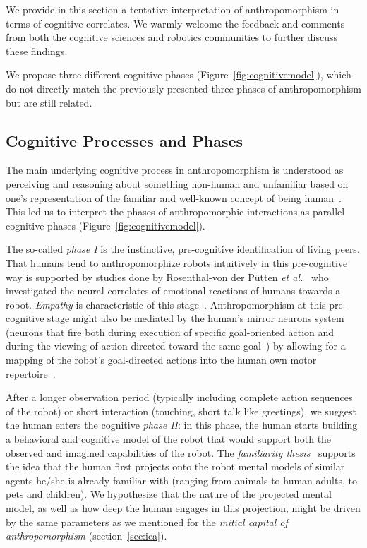 \documentclass{frontiersSCNS} %
\begin{document}
We provide in this section a tentative interpretation of anthropomorphism in
terms of cognitive correlates. We warmly welcome the feedback and
comments from both the cognitive sciences and robotics communities to further
discuss these findings.

We propose three different cognitive phases (Figure~\ref{fig:cognitivemodel}),
which do not directly match the previously presented three phases of
anthropomorphism but are still related.


\subsection*{Cognitive Processes and Phases}

The main underlying cognitive process in anthropomorphism is understood as
perceiving and reasoning about something non-human and unfamiliar based on one's
representation of the familiar and well-known concept of being
human~\cite{epley_when_2008}. This led us to interpret the phases of
anthropomorphic interactions as parallel cognitive phases
(Figure~\ref{fig:cognitivemodel}).

The so-called \emph{phase I} is the instinctive, pre-cognitive identification of
living peers. That humans tend to anthropomorphize robots intuitively in this
pre-cognitive way
is supported by studies done by Rosenthal-von der Pütten
\textit{et al.}~\cite{rosenthal-vonderputten_experimental_2013} who investigated
the neural correlates of emotional reactions of humans towards a robot. {\it
Empathy} is characteristic of this stage~\cite{rosenthalvonderPutten2013neural}.
Anthropomorphism at this pre-cognitive stage might also be mediated by the
human's mirror neurons system (neurons that fire both during execution of
specific goal-oriented action and during the viewing of action directed toward
the same goal~\cite{Rizzolatti1996, Kilner2009}) by allowing for a mapping of
the robot's goal-directed actions into the human own motor
repertoire~\cite{Gallese1998, Wolpert2003, cullen2013individual}.

After a longer observation period (typically including complete action sequences
of the robot) or short interaction (touching, short talk like greetings), we
suggest the human enters the cognitive \emph{phase II}: in this phase, the human
starts building a behavioral and cognitive model of the robot that would support
both the observed and imagined capabilities of the robot.  The \emph{familiarity
thesis}~\cite{hegel_understanding_2008} supports the idea that the human
first projects onto the robot mental models of similar agents he/she is already
familiar with (ranging from animals to human adults, to pets and children). We 
hypothesize that the nature of the projected mental
model, as well as how deep the human engages in this projection, might be
driven by the same parameters as we mentioned for the \emph{initial capital of
anthropomorphism} (section~\ref{sec:ica}).
\end{document}
